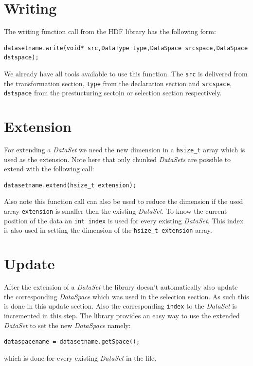 \section{Writing} 
The writing function call from the HDF library has the following form:
\begin{lstlisting}
datasetname.write(void* src,DataType type,DataSpace srcspace,DataSpace dstspace);
\end{lstlisting}
We already have all tools available to use this function. The \texttt{src} is delivered from the transformation section, \texttt{type} from the declaration section and \texttt{srcspace}, \texttt{dstspace} from the prestucturing sectoin or selection section respectively.

\section{Extension}
For extending a \textit{DataSet} we need the new dimension in a \texttt{hsize\_t} array which is used as the extension. Note here that only chunked \textit{DataSets} are possible to extend with the following call:
\begin{lstlisting}
datasetname.extend(hsize_t extension);
\end{lstlisting}
Also note this function call can also be used to reduce the dimension if the used array \texttt{extension} is smaller then the existing \textit{DataSet}. To know the current position of the data an \texttt{int index} is used for every existing \textit{DataSet}. This index is also used in setting the dimension of the \texttt{hsize\_t extension} array.

\section{Update}
After the extension of a \textit{DataSet} the library doesn't automatically also update the corresponding \textit{DataSpace} which was used in the selection section. As such this is done in this update section. Also the corresponding \texttt{index} to the \textit{DataSet} is incremented in this step. The library provides an easy way to use the extended \textit{DataSet} to set the new \textit{DataSpace} namely:
\begin{lstlisting}
dataspacename = datasetname.getSpace();
\end{lstlisting}
which is done for every existing \textit{DataSet} in the file.

